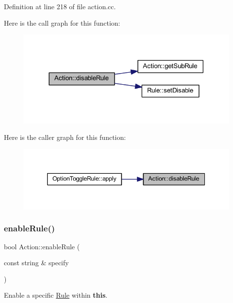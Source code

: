 Definition at line 218 of file action.\+cc.

Here is the call graph for this function\+:
\nopagebreak
\begin{figure}[H]
\begin{center}
\leavevmode
\includegraphics[width=318pt]{class_action_a3409170bddedb8af0b3ac88fabb78642_cgraph}
\end{center}
\end{figure}
Here is the caller graph for this function\+:
\nopagebreak
\begin{figure}[H]
\begin{center}
\leavevmode
\includegraphics[width=339pt]{class_action_a3409170bddedb8af0b3ac88fabb78642_icgraph}
\end{center}
\end{figure}
\mbox{\label{class_action_a1ed085983061bb5fac5560554af33d74}} 
\subsubsection{\texorpdfstring{enableRule()}{enableRule()}}
{\footnotesize\ttfamily bool Action\+::enable\+Rule (\begin{DoxyParamCaption}\item[{const string \&}]{specify }\end{DoxyParamCaption})}



Enable a specific \mbox{\hyperlink{class_rule}{Rule}} within {\bfseries{this}}. 

